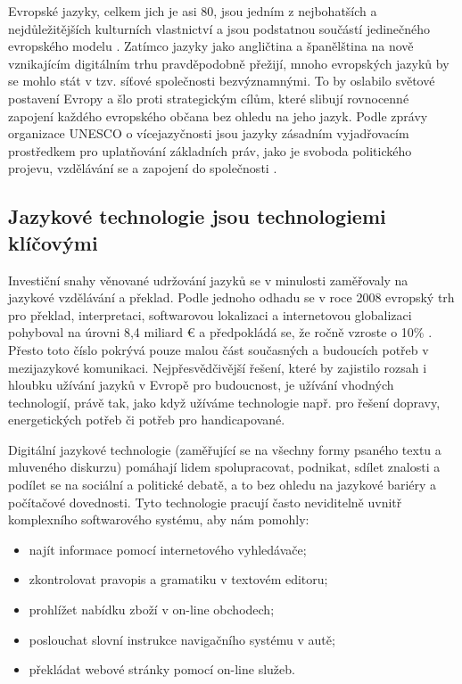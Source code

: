 \begin{multicols}{2}

Evropské jazyky, celkem jich je asi 80, jsou jedním z nejbohatších a nejdůležitějších kulturních vlastnictví a jsou podstatnou součástí jedinečného evropského modelu \cite{EC2}. Zatímco jazyky jako angličtina a španělština na nově vznikajícím digitálním trhu pravděpodobně přežijí, mnoho evropských jazyků by se mohlo stát v tzv. síťové společnosti bezvýznamnými. To by oslabilo světové postavení Evropy a šlo proti strategickým cílům, které slibují rovnocenné zapojení každého evropského občana bez ohledu na jeho jazyk. Podle zprávy organizace UNESCO o vícejazyčnosti jsou jazyky zásadním vyjadřovacím prostředkem pro uplatňování základních práv, jako je svoboda politického projevu, vzdělávání se a zapojení do společnosti \cite{Unesco1}.

\subsection{Jazykové technologie jsou technologiemi klíčovými}

Investiční snahy věnované udržování jazyků se v minulosti zaměřovaly na jazykové vzdělávání a překlad. Podle jednoho odhadu se v roce 2008 evropský trh pro překlad, interpretaci, softwarovou lokalizaci a internetovou globalizaci pohyboval na úrovni 8,4 miliard € a předpokládá se, že ročně vzroste o 10\% \cite{EC3}. Přesto toto číslo pokrývá pouze malou část současných a budoucích potřeb v mezijazykové komunikaci. Nejpřesvědčivější řešení, které by zajistilo rozsah i hloubku užívání jazyků v Evropě pro budoucnost, je užívání vhodných technologií, právě tak, jako když užíváme technologie např. pro řešení dopravy, energetických potřeb či potřeb pro handicapované.

Digitální jazykové technologie (zaměřující se na všechny formy psaného textu a mluveného diskurzu) pomáhají lidem spolupracovat, podnikat, sdílet znalosti a podílet se na sociální a politické debatě, a to bez ohledu na jazykové bariéry a počítačové dovednosti. Tyto technologie pracují často neviditelně uvnitř komplexního softwarového systému, aby nám pomohly:

    \begin{itemize}
      \item najít informace pomocí internetového vyhledávače;
      \item zkontrolovat pravopis a gramatiku v textovém editoru;
      \item prohlížet nabídku zboží v on-line obchodech;
      \item poslouchat slovní instrukce navigačního systému v autě;
      \item překládat webové stránky pomocí on-line služeb.
    \end{itemize}
    

\end{multicols}
